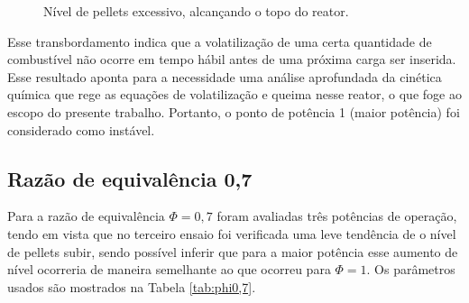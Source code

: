 \begin{figure}[!ht]
	\centering
	\caption{Nível de pellets excessivo, alcançando o topo do reator.}
	\label{fig:transb}
\end{figure}

Esse transbordamento indica que a volatilização de uma certa quantidade de combustível não ocorre em tempo hábil antes de uma próxima carga ser inserida. Esse resultado aponta para a necessidade uma análise aprofundada da cinética química que rege as equações de volatilização e queima nesse reator, o que foge ao escopo do presente trabalho. Portanto, o ponto de potência 1 (maior potência) foi considerado como instável. 
\subsection{Razão de equivalência 0,7}
Para a razão de equivalência $\Phi = 0,7$ foram avaliadas três potências de operação, tendo em vista que no terceiro ensaio foi verificada uma leve tendência de o nível de pellets subir, sendo possível inferir que para a maior potência esse aumento de nível ocorreria de maneira semelhante ao que ocorreu para $\Phi=1$. Os parâmetros usados são mostrados na Tabela \ref{tab:phi0,7}.

